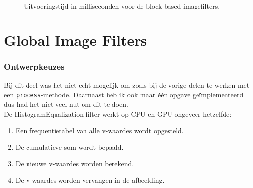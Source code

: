 \documentclass[12pt]{article}
\begin{document}
\begin{figure}[H]
    \caption{Uitvoeringstijd in milliseconden voor de block-based imagefilters.}
    \label{fig:block}
\end{figure}

\part{Global Image Filters}

\section*{Ontwerpkeuzes}

Bij dit deel was het niet echt mogelijk om zoals bij de vorige delen te werken met een {\tt process}-methode.
Daarnaast heb ik ook maar één opgave geïmplementeerd dus had het niet veel nut om dit te doen.
\\
De HistogramEqualization-filter werkt op CPU en GPU ongeveer hetzelfde:

\begin{enumerate}
    \item Een frequentietabel van alle v-waardes wordt opgesteld.
    \item De cumulatieve som wordt bepaald.
    \item De nieuwe v-waardes worden berekend.
    \item De v-waardes worden vervangen in de afbeelding.
\end{enumerate}
\end{document}

